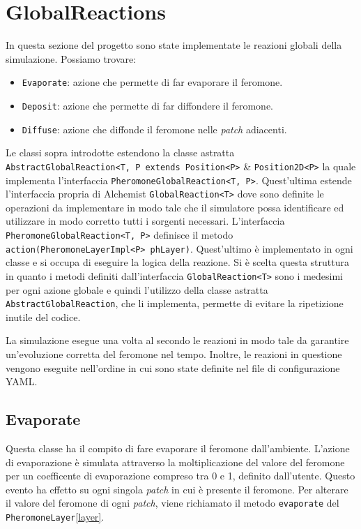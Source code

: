 \section{GlobalReactions}
In questa sezione del progetto sono state implementate le reazioni globali della simulazione. Possiamo trovare:
\begin{itemize}
    \item \texttt{Evaporate}: azione che permette di far evaporare il feromone.
    \item \texttt{Deposit}: azione che permette di far diffondere il feromone.
    \item \texttt{Diffuse}: azione che diffonde il feromone nelle \textit{patch} adiacenti.
\end{itemize}
Le classi sopra introdotte estendono la classe astratta \texttt{AbstractGlobalReaction<T, P extends Position<P>}
\& \texttt{Position2D<P>}
la quale implementa l'interfaccia \newline\texttt{PheromoneGlobalReaction<T, P>}. Quest'ultima estende l'interfaccia 
propria di Alchemist \texttt{GlobalReaction<T>} dove sono definite le operazioni da implementare in modo tale che il 
simulatore possa identificare ed utilizzare in modo corretto tutti i sorgenti necessari.
L'interfaccia \texttt{PheromoneGlobalReaction<T, P>} definisce il metodo \texttt{action(PheromoneLayerImpl<P> phLayer)}.
Quest'ultimo è implementato in ogni classe e si occupa di eseguire la logica della reazione.
Si è scelta questa struttura in quanto i metodi definiti dall'interfaccia \texttt{GlobalReaction<T>}
sono i medesimi per ogni azione globale e quindi l'utilizzo della classe astratta \texttt{AbstractGlobalReaction},
che li implementa, permette di evitare la ripetizione inutile del codice.

La simulazione esegue una volta al secondo le reazioni in modo tale da garantire un'evoluzione corretta del feromone nel tempo. Inoltre, le reazioni
in questione vengono eseguite nell'ordine in cui sono state definite nel file di configurazione YAML\@.
\subsection{Evaporate}
Questa classe ha il compito di fare evaporare il feromone dall'ambiente. L'azione di evaporazione è simulata
attraverso la moltiplicazione del valore del feromone per un coefficente di evaporazione compreso tra 0 e 1, 
definito dall'utente. Questo evento ha effetto su ogni singola \textit{patch} in cui è presente il feromone.
Per alterare il valore del feromone di ogni \textit{patch}, viene richiamato il metodo 
\texttt{evaporate} del \texttt{PheromoneLayer}\space\ref{layer}.
\newline
[ht]

